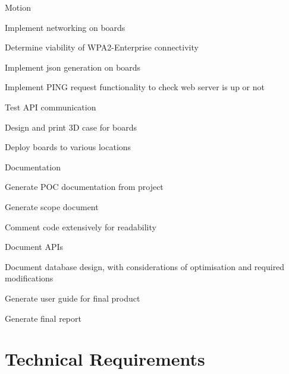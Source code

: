 \documentclass{article}
\begin{document}
\begin{legal}
\begin{legal}
\begin{legal}
                        \item Motion
                    \end{legal}
                    \item Implement networking on boards
                    \begin{legal}
                        \item Determine viability of WPA2-Enterprise connectivity
                    \end{legal}
                    \item Implement json generation on boards
                    \item Implement PING request functionality to check web server is up or not
                    \item Test API communication
                    \item Design and print 3D case for boards
                    \item Deploy boards to various locations
                \end{legal}
                \item Documentation
                \begin{legal}
                    \item Generate POC documentation from project
                    \item Generate scope document
                    \item Comment code extensively for readability
                    \item Document APIs
                    \item Document database design, with considerations of optimisation and required modifications
                    \item Generate user guide for final product
                    \item Generate final report
                \end{legal}
            \end{legal}
        \newpage
    
    \section{Technical Requirements}
\end{document}
